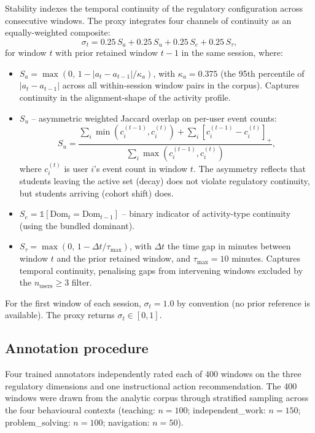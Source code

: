 \documentclass[preprint,12pt,authoryear]{elsarticle}
\begin{document}
Stability indexes the temporal continuity of the regulatory configuration across consecutive windows. The proxy integrates four channels of continuity as an equally-weighted composite:
\begin{equation}
\sigma_t = 0.25\,S_a + 0.25\,S_u + 0.25\,S_e + 0.25\,S_\tau,
\label{eq:stability}
\end{equation}
for window $t$ with prior retained window $t-1$ in the same session, where:
\begin{itemize}
\item $S_a = \max(0,\, 1 - |a_t - a_{t-1}|/\kappa_a)$, with $\kappa_a = 0.375$ (the 95th percentile of $|a_t - a_{t-1}|$ across all within-session window pairs in the corpus). Captures continuity in the alignment-shape of the activity profile.
\item $S_u$ -- asymmetric weighted Jaccard overlap on per-user event counts:
\[
S_u = \frac{\sum_i \min(c_i^{(t-1)}, c_i^{(t)}) + \sum_i [c_i^{(t-1)} - c_i^{(t)}]_+}{\sum_i \max(c_i^{(t-1)}, c_i^{(t)})},
\]
where $c_i^{(t)}$ is user $i$'s event count in window $t$. The asymmetry reflects that students leaving the active set (decay) does not violate regulatory continuity, but students arriving (cohort shift) does.
\item $S_e = \mathbb{1}[\mathrm{Dom}_t = \mathrm{Dom}_{t-1}]$ -- binary indicator of activity-type continuity (using the bundled dominant).
\item $S_\tau = \max(0,\, 1 - \Delta t / \tau_{\max})$, with $\Delta t$ the time gap in minutes between window $t$ and the prior retained window, and $\tau_{\max} = 10$ minutes. Captures temporal continuity, penalising gaps from intervening windows excluded by the $n_{\mathrm{users}} \geq 3$ filter.
\end{itemize}
For the first window of each session, $\sigma_t = 1.0$ by convention (no prior reference is available). The proxy returns $\sigma_t \in [0,1]$.

\subsection{Annotation procedure}
\label{sec:annotation}

Four trained annotators independently rated each of 400 windows on the three regulatory dimensions and one instructional action recommendation. The 400 windows were drawn from the analytic corpus through stratified sampling across the four behavioural contexts (teaching: $n = 100$; independent\_work: $n = 150$; problem\_solving: $n = 100$; navigation: $n = 50$).
\end{document}
